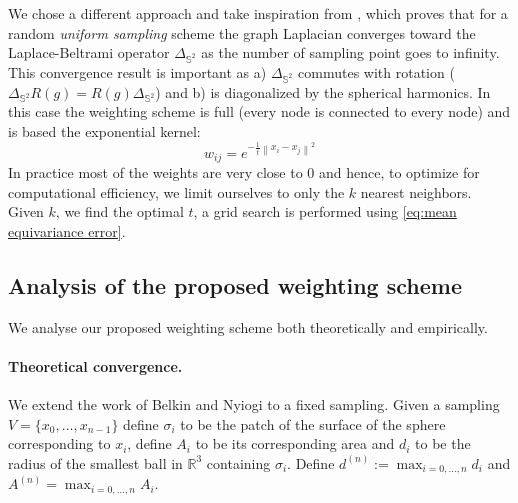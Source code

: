 \documentclass{article} %
\newcommand{\norm}[1]{\left\lVert#1\right\rVert}
\newcommand{\nati}[1]{{\color[rgb]{.3,.5,.9}{#1}}}
\begin{document}
We chose a different approach and take inspiration from \cite{belkin2005towards}, which proves that for a random \emph{uniform sampling} scheme the graph Laplacian converges toward the Laplace-Beltrami operator $\Delta_{\mathbb{S}^2}$ as the number of sampling point goes to infinity.
This convergence result is important as a) $\Delta_{\mathbb{S}^2}$ commutes with rotation ($\Delta_{\mathbb{S}^2}R(g) = R(g)\Delta_{\mathbb{S}^2}$) and b) is diagonalized by the spherical harmonics. 
In this case the weighting scheme is full (every node is connected to every node) and is based the exponential kernel: 
\nati{@martino, please check this equation... Do you use 4t?}
\begin{equation} \label{eq:belkin_weights}
w_{ij} = e^{-\frac{1}{t} \norm{x_i-x_j}^2}
\end{equation}
In practice most of the weights are very close to $0$ and hence, to optimize for computational efficiency, we limit ourselves to only the $k$ nearest neighbors. Given $k$, we find the optimal $t$, a grid search is performed using \eqref{eq:mean equivariance error}.


\subsection{Analysis of the proposed weighting scheme}
We analyse our proposed weighting scheme both theoretically and empirically.

\paragraph{Theoretical convergence.}
We extend the work of Belkin and Nyiogi to a fixed sampling. 
Given a sampling $V = \{x_0, \dots, x_{n-1}\}$ define $\sigma_i$ to be the patch of the surface of the sphere corresponding to $x_i$, define $A_i$ to be its corresponding area and $d_i$ to be the radius of the smallest ball in $\mathbb R^3$ containing $\sigma_i$. Define $d^{(n)} := \max_{i=0, \dots, n}d_i$ and $A^{(n)}=\max_{i=0, \dots, n}A_i$.
\end{document}
